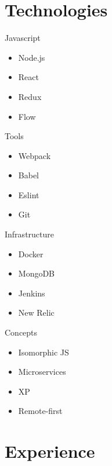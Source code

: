\documentclass[11pt, a4paper, sans]{moderncv}
\date{11/08/2018}
\begin{document}
\makecvtitle

\section{Technologies}

\small{
  \begin{cvcolumns}
    \cvcolumn
      {Javascript}
      {
        \begin{itemize}
          \item Node.js
          \item React
          \item Redux
          \item Flow
        \end{itemize}
      }

    \cvcolumn
      {Tools}
      {
        \begin{itemize}
          \item Webpack
          \item Babel
          \item Eslint
          \item Git
        \end{itemize}
      }

    \cvcolumn
      {Infrastructure}
      {
        \begin{itemize}
          \item Docker
          \item MongoDB
          \item Jenkins
          \item New Relic
        \end{itemize}
      }

    \cvcolumn
      {Concepts}
      {
        \begin{itemize}
          \item Isomorphic JS
          \item Microservices
          \item XP
          \item Remote-first
        \end{itemize}
      }
  \end{cvcolumns}
}

\vspace*{-5mm}

\section{Experience}
\end{document}
